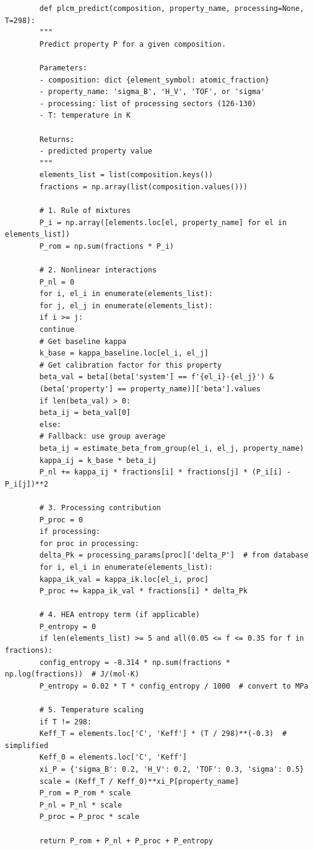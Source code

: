 \documentclass[12pt,a4paper]{article}
\begin{document}
	\begin{verbatim}
		def plcm_predict(composition, property_name, processing=None, T=298):
		"""
		Predict property P for a given composition.
		
		Parameters:
		- composition: dict {element_symbol: atomic_fraction}
		- property_name: 'sigma_B', 'H_V', 'TOF', or 'sigma'
		- processing: list of processing sectors (126-130)
		- T: temperature in K
		
		Returns:
		- predicted property value
		"""
		elements_list = list(composition.keys())
		fractions = np.array(list(composition.values()))
		
		# 1. Rule of mixtures
		P_i = np.array([elements.loc[el, property_name] for el in elements_list])
		P_rom = np.sum(fractions * P_i)
		
		# 2. Nonlinear interactions
		P_nl = 0
		for i, el_i in enumerate(elements_list):
		for j, el_j in enumerate(elements_list):
		if i >= j:
		continue
		# Get baseline kappa
		k_base = kappa_baseline.loc[el_i, el_j]
		# Get calibration factor for this property
		beta_val = beta[(beta['system'] == f'{el_i}-{el_j}') & 
		(beta['property'] == property_name)]['beta'].values
		if len(beta_val) > 0:
		beta_ij = beta_val[0]
		else:
		# Fallback: use group average
		beta_ij = estimate_beta_from_group(el_i, el_j, property_name)
		kappa_ij = k_base * beta_ij
		P_nl += kappa_ij * fractions[i] * fractions[j] * (P_i[i] - P_i[j])**2
		
		# 3. Processing contribution
		P_proc = 0
		if processing:
		for proc in processing:
		delta_Pk = processing_params[proc]['delta_P']  # from database
		for i, el_i in enumerate(elements_list):
		kappa_ik_val = kappa_ik.loc[el_i, proc]
		P_proc += kappa_ik_val * fractions[i] * delta_Pk
		
		# 4. HEA entropy term (if applicable)
		P_entropy = 0
		if len(elements_list) >= 5 and all(0.05 <= f <= 0.35 for f in fractions):
		config_entropy = -8.314 * np.sum(fractions * np.log(fractions))  # J/(mol·K)
		P_entropy = 0.02 * T * config_entropy / 1000  # convert to MPa
		
		# 5. Temperature scaling
		if T != 298:
		Keff_T = elements.loc['C', 'Keff'] * (T / 298)**(-0.3)  # simplified
		Keff_0 = elements.loc['C', 'Keff']
		xi_P = {'sigma_B': 0.2, 'H_V': 0.2, 'TOF': 0.3, 'sigma': 0.5}
		scale = (Keff_T / Keff_0)**xi_P[property_name]
		P_rom = P_rom * scale
		P_nl = P_nl * scale
		P_proc = P_proc * scale
		
		return P_rom + P_nl + P_proc + P_entropy
	\end{verbatim}
	
\end{document}
